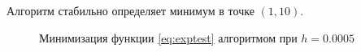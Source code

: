 Алгоритм стабильно определяет минимум в точке $(1, 10)$.

\begin{figure}[!thb]
  \centering
  \caption[\gdrelch{} на экспоненциальной функции]{Минимизация функции
    \eqref{eq:exptest} алгоритмом \gdrelch{} при $h=0.0005$}
\end{figure}